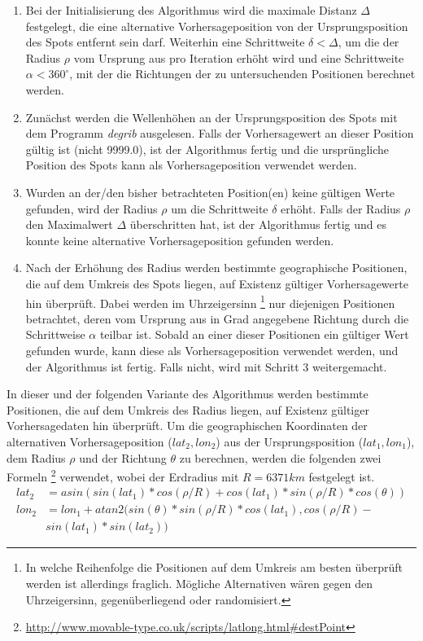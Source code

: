 \begin{enumerate}

\item Bei der Initialisierung des Algorithmus wird die maximale
  Distanz $\Delta$ festgelegt, die eine alternative Vorhersageposition
  von der Ursprungsposition des Spots entfernt sein darf. Weiterhin
  eine Schrittweite $\delta < \Delta$, um die der Radius $\rho$ vom
  Ursprung aus pro Iteration erhöht wird und eine Schrittweite $\alpha
  < 360^{\circ}$, mit der die Richtungen der zu untersuchenden
  Positionen berechnet werden.

\item Zunächst werden die Wellenhöhen an der Ursprungsposition des
  Spots mit dem Programm \textit{degrib} ausgelesen. Falls der
  Vorhersagewert an dieser Position gültig ist (nicht 9999.0), ist der
  Algorithmus fertig und die ursprüngliche Position des Spots kann als
  Vorhersageposition verwendet werden.

\item Wurden an der/den bisher betrachteten Position(en) keine
  gültigen Werte gefunden, wird der Radius $\rho$ um die Schrittweite
  $\delta$ erhöht. Falls der Radius $\rho$ den Maximalwert $\Delta$
  überschritten hat, ist der Algorithmus fertig und es konnte keine
  alternative Vorhersageposition gefunden werden.

\item Nach der Erhöhung des Radius werden bestimmte geographische
  Positionen, die auf dem Umkreis des Spots liegen, auf Existenz
  gültiger Vorhersagewerte hin überprüft. Dabei werden im
  Uhrzeigersinn \footnote{In welche Reihenfolge die Positionen auf dem
    Umkreis am besten überprüft werden ist allerdings
    fraglich. Mögliche Alternativen wären gegen den Uhrzeigersinn,
    gegenüberliegend oder randomisiert.} nur diejenigen Positionen
  betrachtet, deren vom Ursprung aus in Grad angegebene Richtung durch
  die Schrittweise $\alpha$ teilbar ist. Sobald an einer dieser
  Positionen ein gültiger Wert gefunden wurde, kann diese als
  Vorhersageposition verwendet werden, und der Algorithmus ist
  fertig. Falls nicht, wird mit Schritt 3 weitergemacht.

\end{enumerate}

In dieser und der folgenden Variante des Algorithmus werden bestimmte
Positionen, die auf dem Umkreis des Radius liegen, auf Existenz
gültiger Vorhersagedaten hin überprüft. Um die geographischen
Koordinaten der alternativen Vorhersageposition ($lat_2,lon_2$) aus
der Ursprungsposition ($lat_1,lon_1$), dem Radius $\rho$ und der
Richtung $\theta$ zu berechnen, werden die folgenden zwei Formeln
\footnote{\url{http://www.movable-type.co.uk/scripts/latlong.html\#destPoint}}
verwendet, wobei der Erdradius mit $R = 6371 km$ festgelegt ist.
\begin{align*}
  lat_2 & = asin(sin(lat_1)*cos(\rho/R) + cos(lat_1)*sin(\rho/R)*cos(\theta)) \\
  lon_2 & = lon_1 + atan2(sin(\theta)*sin(\rho/R)*cos(lat_1), cos(\rho/R)- \\ & sin(lat_1)*sin(lat_2))
\end{align*}

